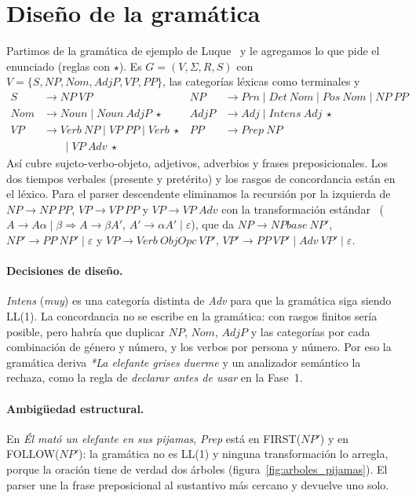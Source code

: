 \section{Diseño de la gramática}
\label{sec:gramatica}

Partimos de la gramática de ejemplo de Luque~\cite{luque} y le agregamos lo que pide el
enunciado (reglas con $\star$). Es $G = (V, \Sigma, R, S)$ con
$V = \{S, NP, Nom, AdjP, VP, PP\}$, las categorías léxicas como terminales y
\begin{align*}
  S    &\to NP\ VP &
  NP   &\to \textit{Prn} \mid \textit{Det}\ Nom \mid \textit{Pos}\ Nom \mid NP\ PP \\
  Nom  &\to \textit{Noun} \mid \textit{Noun}\ AdjP\ \star &
  AdjP &\to \textit{Adj} \mid \textit{Intens}\ \textit{Adj}\ \star \\
  VP   &\to \textit{Verb}\ NP \mid VP\ PP \mid \textit{Verb}\ \star &
  PP   &\to \textit{Prep}\ NP \\
       &\phantom{\to}\ \mid VP\ \textit{Adv}\ \star
\end{align*}
Así cubre sujeto-verbo-objeto, adjetivos, adverbios y frases preposicionales. Los dos tiempos
verbales (presente y pretérito) y los rasgos de concordancia están en el léxico. Para el parser
descendente eliminamos la recursión por la izquierda de $NP \to NP\ PP$, $VP \to VP\ PP$ y
$VP \to VP\ \textit{Adv}$ con la transformación estándar~\cite{hmu}
($A \to A\alpha \mid \beta \Rightarrow A \to \beta A'$, $A' \to \alpha A' \mid \varepsilon$),
que da $NP \to NPbase\ NP'$, $NP' \to PP\ NP' \mid \varepsilon$ y
$VP \to \textit{Verb}\ ObjOpc\ VP'$, $VP' \to PP\ VP' \mid \textit{Adv}\ VP' \mid \varepsilon$.

\paragraph{Decisiones de diseño.} \textit{Intens} (\emph{muy}) es una categoría distinta de
\textit{Adv} para que la gramática siga siendo LL(1). La concordancia no se escribe en la
gramática: con rasgos finitos sería posible, pero habría que duplicar $NP$, $Nom$, $AdjP$ y las
categorías por cada combinación de género y número, y los verbos por persona y número. Por eso
la gramática deriva \emph{*La elefante grises duerme} y un analizador semántico la rechaza, como
la regla de \emph{declarar antes de usar} en la Fase~1.

\paragraph{Ambigüedad estructural.} En \emph{Él mató un elefante en sus pijamas}, \textit{Prep}
está en FIRST($NP'$) y en FOLLOW($NP'$): la gramática no es LL(1) y ninguna transformación lo
arregla, porque la oración tiene de verdad dos árboles (figura~\ref{fig:arboles_pijamas}). El
parser une la frase preposicional al sustantivo más cercano y devuelve uno solo.

